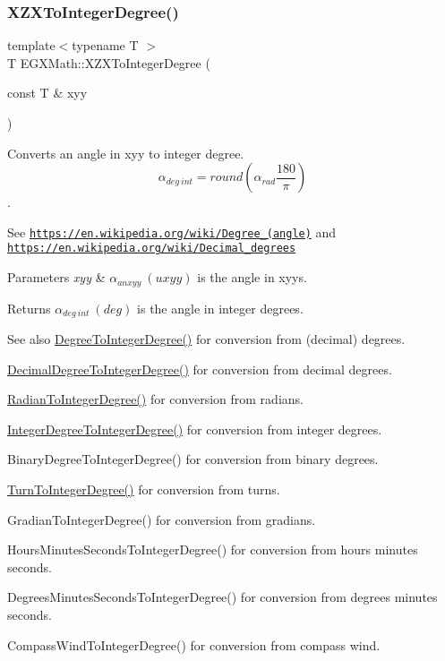 \subsubsection{\texorpdfstring{X\+Z\+X\+To\+Integer\+Degree()}{XZXToIntegerDegree()}}
{\footnotesize\ttfamily template$<$typename T $>$ \\
T E\+G\+X\+Math\+::\+X\+Z\+X\+To\+Integer\+Degree (\begin{DoxyParamCaption}\item[{const T \&}]{xyy }\end{DoxyParamCaption})}



Converts an angle in xyy to integer degree. \[\alpha_{deg\ int}=round(\alpha_{rad}\frac{180}{\pi})\]. 

See \href{https://en.wikipedia.org/wiki/Degree_(angle)}{\tt https\+://en.\+wikipedia.\+org/wiki/\+Degree\+\_\+(angle)} and \href{https://en.wikipedia.org/wiki/Decimal_degrees}{\tt https\+://en.\+wikipedia.\+org/wiki/\+Decimal\+\_\+degrees} 
\begin{DoxyParams}{Parameters}
{\em xyy} & $\alpha_{anxyy}\ (uxyy)$ is the angle in xyys. \\
\hline
\end{DoxyParams}
\begin{DoxyReturn}{Returns}
$\alpha_{deg\ int}\ (deg)$ is the angle in integer degrees. 
\end{DoxyReturn}
\begin{DoxySeeAlso}{See also}
\mbox{\hyperlink{group___e_g_x_math-_angle_conversions-_degree_gaabd20f21be3c18ee423d0bc1a677c6f6}{Degree\+To\+Integer\+Degree()}} for conversion from (decimal) degrees. 

\mbox{\hyperlink{group___e_g_x_math-_angle_conversions-_decimal_degree_ga115239ea7202dbc6a6c9fba68e0ac189}{Decimal\+Degree\+To\+Integer\+Degree()}} for conversion from decimal degrees. 

\mbox{\hyperlink{group___e_g_x_math-_angle_conversions-_radian_gac84796dfdeb56235e1e338522a5f9350}{Radian\+To\+Integer\+Degree()}} for conversion from radians. 

\mbox{\hyperlink{group___e_g_x_math-_angle_conversions-_integer_degree_gac9e870bdfa60dd2bb61469fdf6eedd7c}{Integer\+Degree\+To\+Integer\+Degree()}} for conversion from integer degrees. 

Binary\+Degree\+To\+Integer\+Degree() for conversion from binary degrees. 

\mbox{\hyperlink{group___e_g_x_math-_angle_conversions-_turn_ga999085c62490997da870618e20e88ebb}{Turn\+To\+Integer\+Degree()}} for conversion from turns. 

Gradian\+To\+Integer\+Degree() for conversion from gradians. 

Hours\+Minutes\+Seconds\+To\+Integer\+Degree() for conversion from hours minutes seconds. 

Degrees\+Minutes\+Seconds\+To\+Integer\+Degree() for conversion from degrees minutes seconds. 

Compass\+Wind\+To\+Integer\+Degree() for conversion from compass wind. 
\end{DoxySeeAlso}

